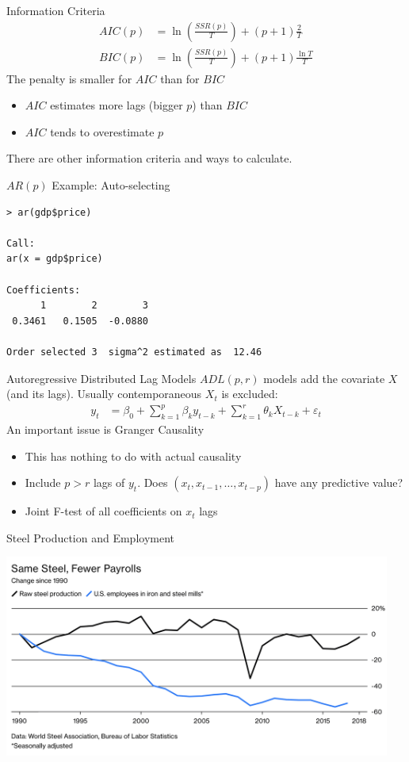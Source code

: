 \begin{frame}{Information Criteria}
\begin{align*}
AIC(p) &= \ln \left(\frac{SSR(p)}{T} \right) + (p+1) \frac{2}{T}\\
BIC(p) &= \ln \left(\frac{SSR(p)}{T} \right) + (p+1) \frac{\ln T}{T}
\end{align*}
The penalty is smaller for $AIC$ than for $BIC$
\begin{itemize}
  \item $AIC$ estimates more lags (bigger $p$) than $BIC$
  \item $AIC$ tends to overestimate $p$
\end{itemize}
There are other information criteria and ways to calculate.
\end{frame}

\begin{frame}[fragile]{$AR(p)$ Example: Auto-selecting}
\begin{verbatim}
> ar(gdp$price)

Call:
ar(x = gdp$price)

Coefficients:
      1        2        3  
 0.3461   0.1505  -0.0880  

Order selected 3  sigma^2 estimated as  12.46
\end{verbatim}
\end{frame}

\begin{frame}{Autoregressive Distributed Lag Models}
$ADL(p,r)$ models add the covariate $X$ (and its lags). Usually contemporaneous $X_t$ is excluded:
\begin{align*}
y_t &= \beta_0 + \sum_{k=1}^p \beta_k y_{t-k} + \sum_{k=1}^r \theta_k X_{t-k} + \varepsilon_t
\end{align*}
An important issue is \alert{Granger Causality}
\begin{itemize}
\item This has \alert{nothing to do} with actual causality
\item Include $p>r$ lags of $y_t$. Does $(x_t,x_{t-1},\ldots,x_{t-p})$ have any predictive value?
\item Joint F-test of all coefficients on $x_t$ lags
\end{itemize}
\end{frame}

\begin{frame}{Steel Production and Employment}
\begin{center}
\includegraphics[width=5in]{./resources/steel.png}
\end{center}
\end{frame}

